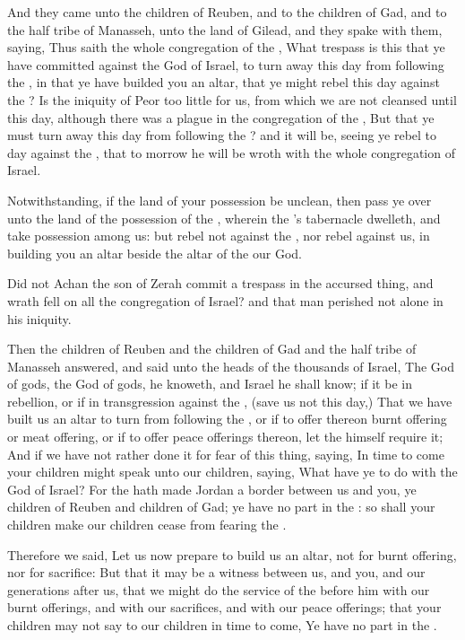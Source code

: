 \Verse And they came unto the children of Reuben, and to the children of Gad, and to the half tribe of Manasseh, unto the land of Gilead, and they spake with them, saying, \Verse Thus saith the whole congregation of the \LORD, What trespass is this that ye have committed against the God of Israel, to turn away this day from following the \LORD, in that ye have builded you an altar, that ye might rebel this day against the \LORD?  \Verse Is the iniquity of Peor too little for us, from which we are not cleansed until this day, although there was a plague in the congregation of the \LORD, \Verse But that ye must turn away this day from following the \LORD? and it will be, seeing ye rebel to day against the \LORD, that to morrow he will be wroth with the whole congregation of Israel.

\Verse Notwithstanding, if the land of your possession be unclean, then pass ye over unto the land of the possession of the \LORD, wherein the \LORD's tabernacle dwelleth, and take possession among us: but rebel not against the \LORD, nor rebel against us, in building you an altar beside the altar of the \LORD our God.

\Verse Did not Achan the son of Zerah commit a trespass in the accursed thing, and wrath fell on all the congregation of Israel? and that man perished not alone in his iniquity.

\Verse Then the children of Reuben and the children of Gad and the half tribe of Manasseh answered, and said unto the heads of the thousands of Israel, \Verse The \LORD God of gods, the \LORD God of gods, he knoweth, and Israel he shall know; if it be in rebellion, or if in transgression against the \LORD, (save us not this day,) \Verse That we have built us an altar to turn from following the \LORD, or if to offer thereon burnt offering or meat offering, or if to offer peace offerings thereon, let the \LORD himself require it; \Verse And if we have not rather done it for fear of this thing, saying, In time to come your children might speak unto our children, saying, What have ye to do with the \LORD God of Israel?  \Verse For the \LORD hath made Jordan a border between us and you, ye children of Reuben and children of Gad; ye have no part in the \LORD: so shall your children make our children cease from fearing the \LORD.

\Verse Therefore we said, Let us now prepare to build us an altar, not for burnt offering, nor for sacrifice: \Verse But that it may be a witness between us, and you, and our generations after us, that we might do the service of the \LORD before him with our burnt offerings, and with our sacrifices, and with our peace offerings; that your children may not say to our children in time to come, Ye have no part in the \LORD.

